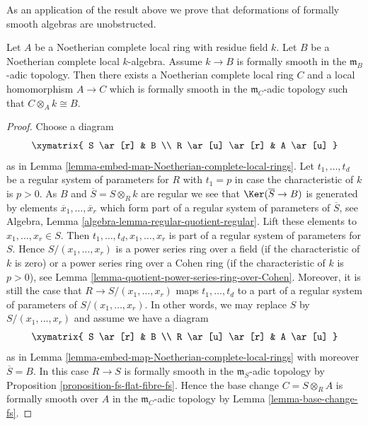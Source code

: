 \noindent
As an application of the result above we prove that deformations
of formally smooth algebras are unobstructed.

\begin{lemma}
\label{lemma-lift-fs}
Let $A$ be a Noetherian complete local ring with residue field $k$.
Let $B$ be a Noetherian complete local $k$-algebra. Assume $k \to B$
is formally smooth in the $\mathfrak m_B$-adic topology.
Then there exists a Noetherian complete local ring $C$
and a local homomorphism $A \to C$ which is formally smooth
in the $\mathfrak m_C$-adic topology such that $C \otimes_A k \cong B$.
\end{lemma}

\begin{proof}
Choose a diagram
$$
\xymatrix{
S \ar[r] & B \\
R \ar[u] \ar[r] & A \ar[u]
}
$$
as in Lemma \ref{lemma-embed-map-Noetherian-complete-local-rings}.
Let $t_1, \ldots, t_d$ be a regular system of parameters for $R$
with $t_1 = p$ in case the characteristic of $k$ is $p > 0$.
As $B$ and $\overline{S} = S \otimes_R k$
are regular we see that $\Ker(\overline{S} \to B)$ is generated by
elements $\overline{x}_1, \ldots, \overline{x}_r$ which form part of a
regular system of parameters of $\overline{S}$, see
Algebra, Lemma \ref{algebra-lemma-regular-quotient-regular}.
Lift these elements to $x_1, \ldots, x_r \in S$. Then
$t_1, \ldots, t_d, x_1, \ldots, x_r$ is part of a regular system of
parameters for $S$. Hence $S/(x_1, \ldots, x_r)$ is a power
series ring over a field (if the characteristic of $k$ is zero)
or a power series ring over a Cohen ring (if the characteristic of
$k$ is $p > 0$), see
Lemma \ref{lemma-quotient-power-series-ring-over-Cohen}.
Moreover, it is still the case that $R \to S/(x_1, \ldots, x_r)$
maps $t_1, \ldots, t_d$ to a part of a regular system of parameters
of $S/(x_1, \ldots, x_r)$. In other words, we may replace $S$ by
$S/(x_1, \ldots, x_r)$ and assume we have a diagram
$$
\xymatrix{
S \ar[r] & B \\
R \ar[u] \ar[r] & A \ar[u]
}
$$
as in Lemma \ref{lemma-embed-map-Noetherian-complete-local-rings}
with moreover $\overline{S} = B$. In this case $R \to S$ is
formally smooth in the $\mathfrak m_S$-adic topology by
Proposition \ref{proposition-fs-flat-fibre-fs}.
Hence the base change $C = S \otimes_R A$ is formally smooth
over $A$ in the $\mathfrak m_C$-adic topology by
Lemma \ref{lemma-base-change-fs}.
\end{proof}

